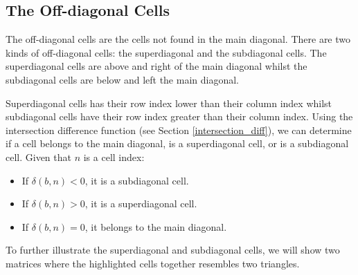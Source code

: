 \documentclass[letterpaper, twoside,12pt]{article}
\begin{document}
    \subsection{The Off-diagonal Cells} \label{offdiagonal_cells}
    The off-diagonal cells are the cells not found in the main diagonal. There are two kinds of off-diagonal cells: the superdiagonal and the subdiagonal cells. The superdiagonal cells are above and right of the main diagonal whilst the subdiagonal cells are below and left the main diagonal.

    Superdiagonal cells has their row index lower than their column index whilst subdiagonal cells have their row index greater than their column index. Using the intersection difference function (see Section \ref{intersection_diff}), we can determine if a cell belongs to the main diagonal, is a superdiagonal cell, or is a subdiagonal cell. Given that $n$ is a cell index:
    \begin{itemize}
        \item If $\delta(b,n) < 0$, it is a subdiagonal cell.
        \item If $\delta(b,n) > 0$, it is a superdiagonal cell.
        \item If $\delta(b,n) = 0$, it belongs to the main diagonal.
    \end{itemize}

    To further illustrate the superdiagonal and subdiagonal cells, we will show two matrices where the highlighted cells together resembles two triangles.
\end{document}
